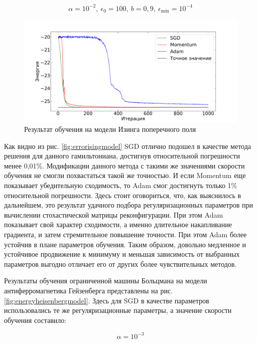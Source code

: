 \[
\alpha=10^{-2},\ \epsilon_0=100,\ b=0,9,\ \epsilon_{\min}=10^{-4}
\]

\begin{figure}[b!]
    \centering
    \includegraphics[width=\linewidth]{pictures/energy_ising_model}
    \caption[]{Результат обучения на модели Изинга поперечного поля}
    \label{fig:energyisingmodel}
\end{figure}

Как видно из рис. \ref{fig:errorisingmodel} SGD отлично подошел в качестве метода решения для данного гамильтониана, достигнув относительной погрешности менее 0,01\%. 
Модификации данного метода с такими же значениями скорости обучения не смогли похвастаться такой же точностью. 
И если Momentum еще показывает убедительную сходимость, то Adam смог достигнуть только 1\% относительной погрешности. 
Здесь стоит оговориться, что, как выяснилось в дальнейшем, это результат удачного подбора регуляризационных параметров при вычислении стохастической матрицы реконфигурации.
При этом Adam показывает свой характер сходимости, а именно длительное накапливание   градиента, и затем стремительное повышение точности.
При этом Adam более устойчив в плане параметров обучения.
Таким образом, довольно медленное и устойчивое продвижение к минимуму и меньшая зависимость от выбранных параметров выгодно отличает его от других более чувствительных методов. 

Результаты обучения ограниченной машины Больцмана на модели антиферромагнетика Гейзенберга представлены на рис. \ref{fig:energyheisenbergmodel}. Здесь для SGD в качестве параметров использовались те же регуляризационные параметры, а значение скорости обучения составило:

\[
\alpha=10^{-3}
\]

